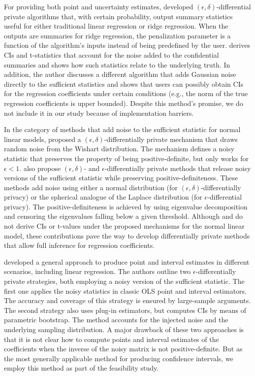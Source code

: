 For providing both point and uncertainty estimates, \citet{sheffet2017differentially} developed $(\epsilon,\delta)$-differential private algorithms that, with certain probability, output summary statistics useful for either traditional linear regression or ridge regression. When the outputs are summaries for ridge regression, the penalization parameter is a function of the algorithm's inputs instead of being predefined by the user. \citet{sheffet2017differentially} derives CIs and t-statistics that account for the noise added to the confidential summaries and shows how such statistics relate to the underlying truth. In addition, the author discusses a different algorithm that adds Gaussian noise directly to the sufficient statistics and shows that users can possibly obtain CIs for the regression coefficients under certain conditions (e.g., the norm of the true regression coefficients is upper bounded). Despite this method's promise, we do not include it in our study because of implementation barriers.

In the category of methods that add noise to the sufficient statistic for normal linear models, \citet{sheffet2019old} proposed a $(\epsilon,\delta)$-differentially private mechanism that draws random noise from the Wishart distribution. The mechanism defines a noisy statistic that preserves the property of being positive-definite, but only works for $\epsilon<1$. \citet{wang2019differentially} also propose $(\epsilon,\delta)$- and $\epsilon$-differentially private methods that release noisy versions of the sufficient statistic while preserving positive-definiteness. These methods add noise using either a normal distribution (for $(\epsilon,\delta)$-differentially privacy) or the spherical analogue of the Laplace distribution (for $\epsilon$-differential privacy). The positive-definiteness is achieved by using eigenvalue decomposition and censoring the eigenvalues falling below a given threshold. Although \citet{sheffet2019old} and \citet{wang2019differentially} do not derive CIs or t-values under the proposed mechanisms for the normal linear model, these contributions pave the way to develop differentially private methods that allow full inference for regression coefficients.  

\citet{ferrando2020general} developed a general approach to produce point and interval estimates in different scenarios, including linear regression. The authors outline two $\epsilon$-differentially private strategies, both employing a noisy version of the sufficient statistic. The first one applies the noisy statistics in classic OLS point and interval estimators. The accuracy and coverage of this strategy is ensured by large-sample arguments. The second strategy also uses plug-in estimators, but computes CIs by means of parametric bootstrap. The method accounts for the injected noise and the underlying sampling distribution. A major drawback of these two approaches is that it is not clear how to compute points and interval estimates of the coefficients when the inverse of the noisy matrix is not positive-definite. But as the most generally applicable method for producing confidence intervals, we employ this method as part of the feasibility study.


